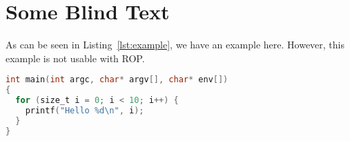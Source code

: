 \chapter{Some Blind Text}

\Blindtext

As can be seen in Listing~\ref{lst:example}, we have an example here.
However, this example is not usable with \gls{ROP}.

\begin{lstlisting}[language=C,label={lst:example},caption={Example C Code}]
int main(int argc, char* argv[], char* env[])
{
  for (size_t i = 0; i < 10; i++) {
    printf("Hello %d\n", i);
  }
}
\end{lstlisting}


\Blindtext
